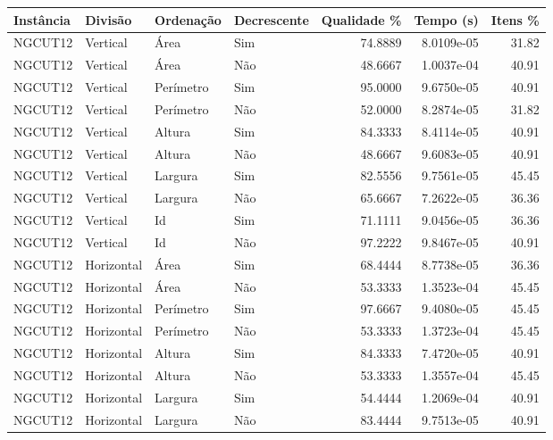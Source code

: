\begin{tabular}{llllrrr}
    \hline
    Instância & Divisão     & Ordenação & Decrescente & Qualidade \% & Tempo (s)  & Itens \% \\
    \hline
    NGCUT12   & Vertical    & Área      & Sim         & 74.8889      & 8.0109e-05 & 31.82    \\
    NGCUT12   & Vertical    & Área      & Não         & 48.6667      & 1.0037e-04 & 40.91    \\
    NGCUT12   & Vertical    & Perímetro & Sim         & 95.0000      & 9.6750e-05 & 40.91    \\
    NGCUT12   & Vertical    & Perímetro & Não         & 52.0000      & 8.2874e-05 & 31.82    \\
    NGCUT12   & Vertical    & Altura    & Sim         & 84.3333      & 8.4114e-05 & 40.91    \\
    NGCUT12   & Vertical    & Altura    & Não         & 48.6667      & 9.6083e-05 & 40.91    \\
    NGCUT12   & Vertical    & Largura   & Sim         & 82.5556      & 9.7561e-05 & 45.45    \\
    NGCUT12   & Vertical    & Largura   & Não         & 65.6667      & 7.2622e-05 & 36.36    \\
    NGCUT12   & Vertical    & Id        & Sim         & 71.1111      & 9.0456e-05 & 36.36    \\
    NGCUT12   & Vertical    & Id        & Não         & 97.2222      & 9.8467e-05 & 40.91    \\
    NGCUT12   & Horizontal  & Área      & Sim         & 68.4444      & 8.7738e-05 & 36.36    \\
    NGCUT12   & Horizontal  & Área      & Não         & 53.3333      & 1.3523e-04 & 45.45    \\
    NGCUT12   & Horizontal  & Perímetro & Sim         & 97.6667      & 9.4080e-05 & 45.45    \\
    NGCUT12   & Horizontal  & Perímetro & Não         & 53.3333      & 1.3723e-04 & 45.45    \\
    NGCUT12   & Horizontal  & Altura    & Sim         & 84.3333      & 7.4720e-05 & 40.91    \\
    NGCUT12   & Horizontal  & Altura    & Não         & 53.3333      & 1.3557e-04 & 45.45    \\
    NGCUT12   & Horizontal  & Largura   & Sim         & 54.4444      & 1.2069e-04 & 40.91    \\
    NGCUT12   & Horizontal  & Largura   & Não         & 83.4444      & 9.7513e-05 & 40.91    \\

\end{tabular}
